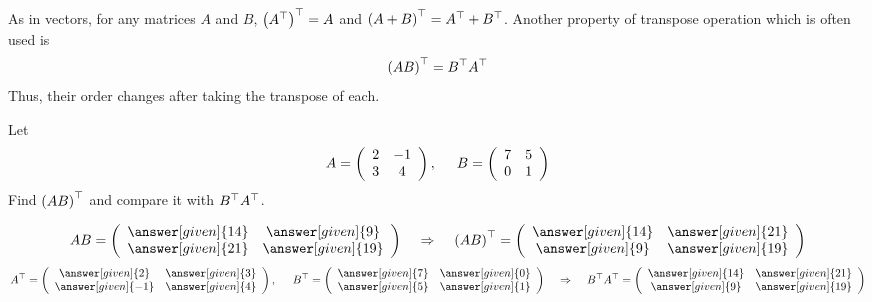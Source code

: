\documentclass{ximera}
\begin{document}
As in vectors, for any matrices $A$ and $B$, $\left(A^{\top}\right)^{\top} = A$ and $\left(A+ B\right)^{\top} = A^{\top} + B^{\top}$. Another property of transpose operation which is often used is
\[
\left(AB\right)^{\top} = B^{\top} A^{\top}
\]
Thus, their order changes after taking the transpose of each.
\begin{question}
Let
\[
A= \left(\begin{array}{cc}
2 & -1 \\
3 & 4
\end{array}\right), \hspace{.5cm} B = \left(\begin{array}{cc}
7 & 5 \\
0 & 1
\end{array}\right)
\]
Find $\left(AB\right)^{\top}$ and compare it with $B^{\top}A^{\top}$.

\begin{prompt}
\[
AB = \left(\begin{array}{cc}
\answer[given]{14} & \answer[given]{9}\\
\answer[given]{21} & \answer[given]{19}
\end{array}\right)
\hspace{.4cm} \Rightarrow \hspace{.4cm}
\left(AB\right)^{\transpose} = \left(\begin{array}{cc}
\answer[given]{14} & \answer[given]{21}\\
\answer[given]{9} & \answer[given]{19}
\end{array}\right)
\]
\[
A^{\transpose}= \left(\begin{array}{cc}
\answer[given]{2} & \answer[given]{3}\\
\answer[given]{-1} & \answer[given]{4}
\end{array}\right), \hspace{.5cm}
B^{\transpose} = \left(\begin{array}{cc}
\answer[given]{7} & \answer[given]{0}\\
\answer[given]{5} & \answer[given]{1}
\end{array}\right)
\hspace{.4cm} \Rightarrow \hspace{.4cm}
B^{\transpose} A^{\transpose}  = \left(\begin{array}{cc}
\answer[given]{14} & \answer[given]{21}\\
\answer[given]{9} & \answer[given]{19}
\end{array}\right)
\]
\end{prompt}
\end{question}
\end{document}
